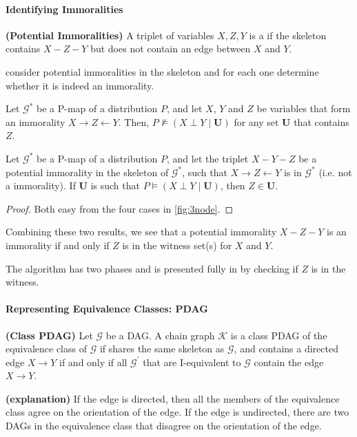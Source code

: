 \documentclass{article}
\newcommand{\bfs}[1]{\textbf{({#1}) }}
\begin{document}
\paragraph{Identifying Immoralities}
\begin{defa}\bfs{Potential Immoralities}
 A triplet of variables $X, Z, Y$ is a  if the skeleton contains $X-Z-Y$ but does not contain an edge between $X$ and $Y$. 
\end{defa}
 consider potential immoralities in the skeleton and for each one determine whether it is indeed an immorality.

\begin{lema}
Let  $\mathcal{G}^{*}$ be a P-map of a distribution $P$,   and let $X$, $Y$ and $Z$   be variables that form an immorality  $X \rightarrow Z \leftarrow Y$. Then, $P \not \models(X \perp Y \mid \boldsymbol{U})$ for any set $\boldsymbol{U}$ that contains $Z$.
\end{lema}
\begin{lema}
Let $\mathcal{G}^{*}$ be a P-map of a distribution $P$, and let the triplet $X-Y-Z$ be a potential immorality in the skeleton of $\mathcal{G}^{*}$, such that $X \rightarrow Z \leftarrow Y$ is  in $\mathcal{G}^{*}$ (i.e. not a immorality). If $\boldsymbol{U}$ is such that $P \models(X \perp Y \mid \boldsymbol{U})$, then $Z \in \boldsymbol{U}$.
\end{lema}
\begin{proof}
 Both easy from the four cases in \cref{fig:3node}.
\end{proof}
\begin{rema}
Combining these two results, we see that a potential immorality $X-Z-Y$ is an immorality if and only if $Z$ is  in the witness set(s) for $X$ and $Y$.
\end{rema}
 The algorithm has two phases and is presented fully in \cite[algorithm 3.4.]{koller2009probabilistic} by checking  if $Z$ is in the witness.
 \paragraph{Representing Equivalence Classes: PDAG}
 \begin{defa}\bfs{Class PDAG}
  Let $\mathcal{G}$ be a DAG. A chain graph $\mathcal{K}$ is a class PDAG of the equivalence class of $\mathcal{G}$ if shares the same skeleton as $\mathcal{G}$, and contains a directed edge $X \rightarrow Y$ if and only if all $\mathcal{G}^{\prime}$ that are I-equivalent to $\mathcal{G}$ contain the edge $X \rightarrow Y$.
 \end{defa}
\begin{rema}\bfs{explanation}
If the edge is directed, then all the members of the equivalence class agree on the orientation of the edge. If the edge is undirected, there are two DAGs in the equivalence class that disagree on the orientation of the edge.
\end{rema}
\end{document}

